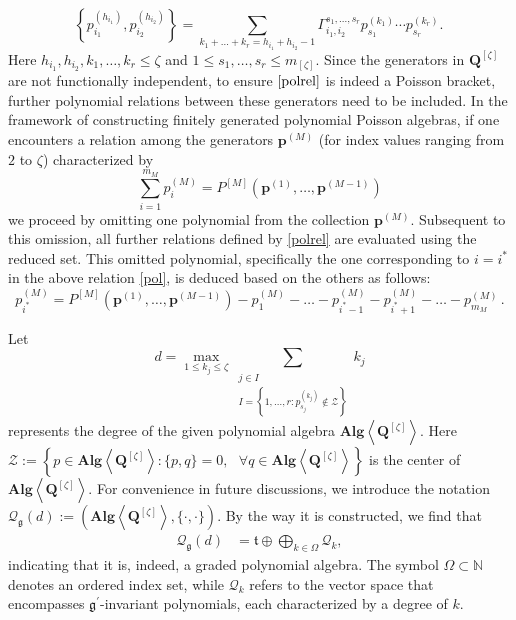 \documentclass[10pt]{amsart}
\theoremstyle{definition}
\theoremstyle{corollary}
\theoremstyle{remark}
\theoremstyle{conclusion}
\begin{document}
\begin{equation}
	\left\{p_{i_1}^{(h_{i_1})} , p_{i_2}^{(h_{i_2})}\right\}  =  \sum_{k_1+\ldots + k_r =h_{i_1} + h_{i_2}-1} \Gamma^{s_1,...,s_r}_{i_1,i_2} p^{(k_1)}_{s_1} \cdots p^{(k_r)}_{s_r}  . \, 
	\label{polrel}
\end{equation} Here $h_{i_1},h_{i_2},k_1,\ldots,k_r \leq \zeta$ and $ 1  \leq s_1,\ldots,s_r \leq m_{[\zeta]}$.     Since the generators in $\boldsymbol{Q}^{[\zeta]}$ are not functionally independent, to ensure $\eqref{polrel}$ is indeed a Poisson bracket, further polynomial relations between these generators need to be included. In the framework of constructing finitely generated polynomial Poisson algebras, if one encounters a relation among the generators $\boldsymbol{p}^{(M)}$ (for index values ranging from $2$ to $\zeta$) characterized by
\begin{equation}
	\sum_{i=1}^{m_M} p_i^{(M)}=P^{[M]}(\boldsymbol{p}^{(1)}, \dots, \boldsymbol{p}^{(M-1)})
	\label{pol}
\end{equation}
we proceed by omitting one polynomial from the collection $\boldsymbol{p}^{(M)}$. Subsequent to this omission, all further relations defined by \eqref{polrel} are evaluated using the reduced set. This omitted polynomial, specifically the one corresponding to $i = i^*$ in the above relation \eqref{pol}, is deduced based on the others as follows:
\begin{equation}
	p_{i^*}^{(M)} = P^{[M]}(\boldsymbol{p}^{(1)}, \dots, \boldsymbol{p}^{(M-1)}) - p_1^{(M)} - \dots - p_{i^*-1}^{(M)} - p_{i^*+1}^{(M)} - \dots - p_{m_M}^{(M)} \, .
	\label{eq:polel}
\end{equation} 


Let \[ d = \max_{1 \leq k_j \leq \zeta} \sum_{\begin{matrix}
    j \in I \\
    I = \left\{1,\ldots,r: p_{s_j}^{(k_j)} \notin \mathcal{Z}\right\}
\end{matrix}} k_j \] represents the degree of the given polynomial algebra $\textbf{Alg} \left\langle \boldsymbol{Q}^{[\zeta]} \right\rangle$. Here $\mathcal{Z} := \left\{p \in \textbf{Alg}\left\langle \boldsymbol{Q}^{[\zeta]}\right\rangle :  \{p,q\} = 0, \text{ } \forall q \in \textbf{Alg}\left\langle \boldsymbol{Q}^{[\zeta]}\right\rangle \right\}$ is the center of $\textbf{Alg}\left\langle \boldsymbol{Q}^{[\zeta]}\right\rangle.$   For convenience in future discussions, we introduce the notation $\mathcal{Q}_\mathfrak{g}(d) := \left(\textbf{Alg} \left\langle \boldsymbol{Q}^{[\zeta]} \right\rangle,\{\cdot,\cdot\} \right)$.  By the way it is constructed, we find that \begin{align*}
    \mathcal{Q}_\mathfrak{g}(d) &= \mathfrak{t} \oplus \bigoplus_{k \in \Omega} \mathcal{Q}_k,
\end{align*} indicating that it is, indeed, a graded polynomial algebra.  The symbol $\Omega \subset \mathbb{N}$ denotes an ordered index set, while $\mathcal{Q}_k$ refers to the vector space that encompasses $\mathfrak{g}^\prime$-invariant polynomials, each characterized by a degree of $k$. 
\end{document}
